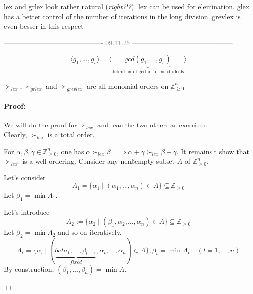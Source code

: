 \begin{remark}[title = Remark]
  lex and grlex look rather natural (\textit{\textcolor{airforceblue}{right?!?}}). lex can be used for elemination. glex has a better control of the number of iterations in the long division.
  grevlex is even besser in this respect. 
\end{remark}

\vspace{0.3em} 
\begin{center}
  \textcolor{gray}{------------------------------------------- 09.11.26 --------------------------------------------} \\[0.3em]
\end{center}
\vspace{0.3em} 

\[
  \langle g_1, \ldots, g_s \rangle = \langle \underbrace{gcd(g_1, \ldots, g_s)}_{\text{definition of gcd in terms of ideals}} \rangle 
\]

\begin{proposition}[title = Proposition 2.1.6]
    $\succ_{lex}, \succ_{grlex}$ and $\succ_{grevlex}$ are all monomial orders on $\mathbb{Z}^n_{\geq 0}$

    \paragraph{Proof:} 
    We will do the proof for $\succ_{lex}$ and leae the two others as exercises. \\[0.3em]
    Clearly, $\succ_{lex}$ is a total order. 

    For $\alpha, \beta, \gamma \in \mathbb{Z}^n_{\geq 0}$, one has $\alpha \succ_{lex} \beta \quad \Rightarrow \alpha + \gamma \succ_{lex} \beta + \gamma$. It remains t show 
    that $\succ_{lex}$ is a well ordering. Consider any nonßempty subset $A$ of $\mathbb{Z}^n_{\geq 0}$.  

    Let's consider \[A_1 = \{\alpha_1 \mid (\alpha_1, \ldots, \alpha_n) \in A\} \subseteq \mathbb{Z}_{\geq 0}\]
    Let $\beta_1 = \min A_1$. 

    Let's introduce \[ A_2 := \{\alpha_2 \mid (\beta_1, \alpha_2, \ldots, \alpha_n) \in A\} \subseteq \mathbb{Z}_{\geq 0}\] Let $\beta_2 = \min A_2$ and so on 
    iteratively. 
    \[A_t =\{ \alpha_t \mid (\underbrace{beta_1, \ldots, \beta_{t-1}}_{fixed}, \alpha_t, \ldots, \alpha_n) \in A\}, \beta_t = \min A_t\quad (t = 1, \ldots, n)\]
    By construction, $(\beta_1, \ldots, \beta_n) = \min A$. 

    \begin{flushright}
      $\Box $
    \end{flushright}
\end{proposition}

